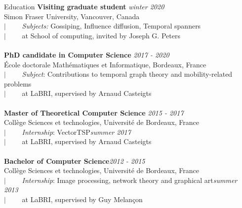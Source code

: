 \documentclass[french]{resume} %
\begin{document}
\begin{rSection}{Education}
{\bf Visiting graduate student} \hfill {\em winter 2020}
\\ Simon Fraser University, Vancouver, Canada
\\ $| \qquad$ \textit{Subjects:} Gossiping, Influence diffusion, Temporal spanners
\\ $| \qquad$ at School of computing, invited by Joseph G. Peters
\\
\\{\bf PhD candidate in Computer Science} \hfill {\em 2017 - 2020} 
\\ École doctorale Mathématiques et Informatique, Bordeaux, France
\\ $| \qquad$ \textit{Subject}: Contributions to temporal graph theory and mobility-related problems
\\ $| \qquad$ at LaBRI, supervised by Arnaud Casteigts
\\
\\{\bf Master of Theoretical Computer Science} \hfill {\em 2015 -  2017} 
\\ Collège Sciences et technologies, Université de Bordeaux, France 
\\ $| \qquad$ \textit{Internship}: VectorTSP\hfill {\em summer 2017} 
\\ $| \qquad $ at LaBRI, supervised by Arnaud Casteigts
\\
\\ \textbf{Bachelor of Computer Science}\hfill {\em 2012 -  2015} 
\\ Collège Sciences et technologies, Université de Bordeaux, France 
\\ $| \qquad$ \textit{Internship}: Image processing, network theory and graphical art\hfill {\em summer 2013} 
\\ $|  \qquad $ at LaBRI, supervised by Guy Melançon
\end{rSection}
\end{document}
